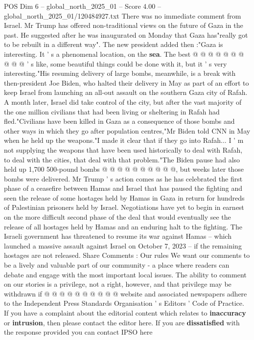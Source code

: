 \begin{textsample}{POS Dim 6 – global\_north\_2025\_01 – Score 4.00 – global\_north\_2025\_01/120484927.txt}
There was no immediate comment from Israel.
Mr Trump has offered non-traditional views on the future of Gaza in the past.
He suggested after he was inaugurated on Monday that Gaza has"really got to be rebuilt in a different way".
The new president added then :"Gaza is interesting.
It ' s a phenomenal location, on the \textbf{sea}.
The best @ @ @ @ @ @ @ @ @ @ ' s like, some beautiful things could be done with it, but it ' s very interesting."His resuming delivery of large bombs, meanwhile, is a break with then-president Joe Biden, who halted their delivery in May as part of an effort to keep Israel from launching an all-out assault on the southern Gaza city of Rafah.
A month later, Israel did take control of the city, but after the vast majority of the one million civilians that had been living or sheltering in Rafah had fled."Civilians have been killed in Gaza as a consequence of those bombs and other ways in which they go after population centres,"Mr Biden told CNN in May when he held up the weapons."I made it clear that if they go into Rafah...
I ' m not supplying the weapons that have been used historically to deal with Rafah, to deal with the cities, that deal with that problem."The Biden pause had also held up 1,700 500-pound bombs @ @ @ @ @ @ @ @ @ @, but weeks later those bombs were delivered.
Mr Trump ' s action comes as he has celebrated the first phase of a ceasefire between Hamas and Israel that has paused the fighting and seen the release of some hostages held by Hamas in Gaza in return for hundreds of Palestinian prisoners held by Israel.
Negotiations have yet to begin in earnest on the more difficult second phase of the deal that would eventually see the release of all hostages held by Hamas and an enduring halt to the fighting.
The Israeli government has threatened to resume its war against Hamas -- which launched a massive assault against Israel on October 7, 2023 -- if the remaining hostages are not released.
Share Comments : Our rules We want our comments to be a lively and valuable part of our community - a place where readers can debate and engage with the most important local issues.
The ability to comment on our stories is a privilege, not a right, however, and that privilege may be withdrawn if @ @ @ @ @ @ @ @ @ @ website and associated newspapers adhere to the Independent Press Standards Organisation ' s Editors ' Code of Practice.
If you have a complaint about the editorial content which relates to \textbf{inaccuracy} or \textbf{intrusion}, then please contact the editor here.
If you are \textbf{dissatisfied} with the response provided you can contact IPSO here

\end{textsample}
